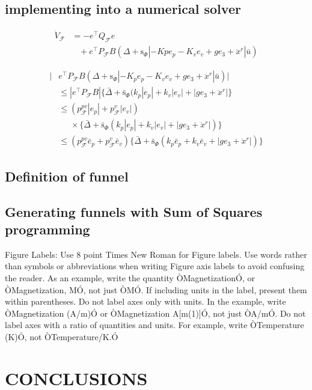 \documentclass[letterpaper, 10 pt, conference]{ieeeconf}  %
\begin{document}
\subsection{implementing into a numerical solver}
\begin{align}
\dot{V}_\mathcal{F} &= -e^\intercal Q_\mathcal{F} e \nonumber \\
&\;\;\;+e^\intercal P_\mathcal{F} B(\Delta+\text{s}_\Phi|-Kpe_p -K_ve_v + ge_3 + \ddot{x}^r|\bar{u}) \nonumber
\end{align}

\begin{align}
|&e^\intercal P_\mathcal{F} B(\Delta+\text{s}_\Phi|-K_p e_p -K_v e_v + ge_3 + \ddot{x}^r|\bar{u})| \nonumber \\
&\leq |e^\intercal P_\mathcal{F}B|\{\bar{\Delta} + \bar{\text{s}}_\Phi(k_p|e_p| + k_v|e_v| + |ge_3+\ddot{x}^r|\} \nonumber \\
&\leq (p_\mathcal{F}^{pv}|e_p|+p_\mathcal{F}^v|e_v|)\nonumber \\
&\;\;\;\;\;\times \{\bar{\Delta}+\bar{\text{s}}_\Phi(k_p|e_p|+k_v|e_v|+|ge_3+\ddot{x}^r|)\} \nonumber \\
&\leq (p_\mathcal{F}^{pv}\bar{e}_p+p_\mathcal{F}^v\bar{e}_v)\{\bar{\Delta}+\bar{\text{s}}_\Phi(k_p\bar{e}_p+k_v\bar{e}_v+|ge_3+\ddot{x}^r|)\} \nonumber 
\end{align}






\subsection{Definition of funnel}
\subsection{Generating funnels with Sum of Squares programming}


Figure Labels: Use 8 point Times New Roman for Figure labels. Use words rather than symbols or abbreviations when writing Figure axis labels to avoid confusing the reader. As an example, write the quantity ÒMagnetizationÓ, or ÒMagnetization, MÓ, not just ÒMÓ. If including units in the label, present them within parentheses. Do not label axes only with units. In the example, write ÒMagnetization (A/m)Ó or ÒMagnetization {A[m(1)]}Ó, not just ÒA/mÓ. Do not label axes with a ratio of quantities and units. For example, write ÒTemperature (K)Ó, not ÒTemperature/K.Ó

\section{CONCLUSIONS}
\end{document}
